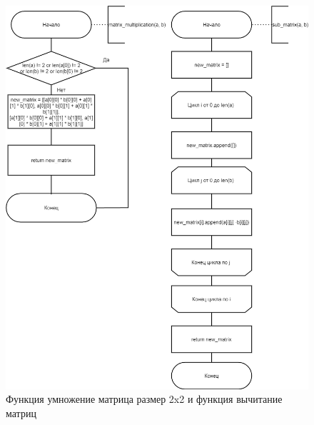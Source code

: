 \begin{figure}[H]
	\begin{center}
		\includegraphics[scale=0.5]{img/strassen2.png}
	\end{center}
	\captionsetup{justification=centering}
	\caption{Функция умножение матрица размер 2x2 и функция вычитание матриц}
	\label{img:strassen2}
\end{figure}

